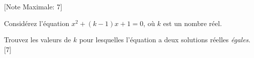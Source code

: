 \begin{question}
  \hspace*{\fill} [Note Maximale: 7]\par
  \medskip
  \noindent Considérez l'équation $x^2 + (k-1)x + 1 = 0$, où $k$ est un nombre réel.\par
  \medskip
  \noindent Trouvez les valeurs de $k$ pour lesquelles l’équation a deux solutions réelles \emph{égales}.\hspace*{\fill} [7]\par
\end{question}
